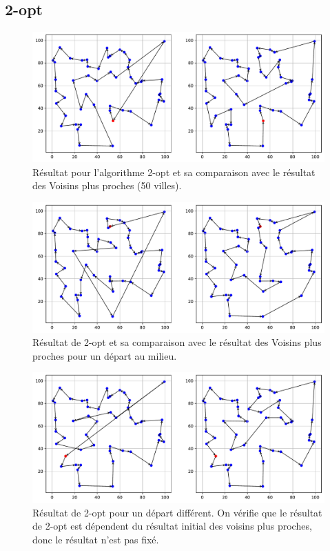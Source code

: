 \documentclass[a4paper,11pt,fleqn]{article}
\begin{document}
\subsection*{2-opt}

\begin{figure}[H]
    \centering
    \includegraphics[width=\textwidth]{images/2opt_50_villes_nn.pdf}
    \caption{Résultat pour l'algorithme 2-opt et sa comparaison avec le résultat des Voisins plus proches (50 villes).}
    \label{fig:2opt-nn}
\end{figure}

\begin{figure}[H]
    \centering
    \includegraphics[width=\textwidth]{images/2opt_50_villes_depart_23.pdf}
    \caption{Résultat de 2-opt et sa comparaison avec le résultat des Voisins plus proches pour un départ au milieu.}
    \label{fig:2opt-dep23}
\end{figure}

\begin{figure}[H]
    \centering
    \includegraphics[width=\textwidth]{images/2opt_50_villes_depart_42.pdf}
    \caption{Résultat de 2-opt pour un départ différent. On vérifie que le résultat de 2-opt est dépendent du résultat initial des voisins plus proches, donc le résultat n'est pas fixé.}
    \label{fig:2opt-dep42}
\end{figure}
\end{document}
